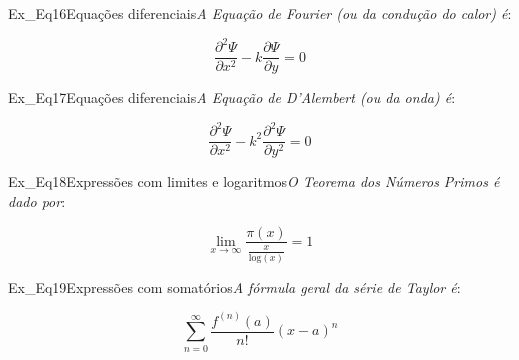 \begin{texercise}{Ex_Eq16}{Equações diferenciais}\textit{A Equação de Fourier (ou da condução do calor) é}:\par\smallskip%
\begin{tcboutputlisting}
    \begin{center}
        \begin{equation*}
            \frac{\partial^{2}\Psi}{\partial x^{2}} -
            k\frac{\partial\Psi}{\partial y} = 0
        \end{equation*}
    \end{center}
\end{tcboutputlisting}
\tcbuselistingtext%
\end{texercise}

\begin{texercise}{Ex_Eq17}{Equações diferenciais}\textit{A Equação de D'Alembert (ou da onda) é}:\par\smallskip%
\begin{tcboutputlisting}
    \begin{center}
        \begin{equation*}
            \frac{\partial^{2}\Psi}{\partial x^{2}} - 
            k^{2}\frac{\partial^{2}\Psi}{\partial y^{2}} = 0
        \end{equation*}
    \end{center}
\end{tcboutputlisting}
\tcbuselistingtext%
\end{texercise}

\begin{texercise}{Ex_Eq18}{Expressões com limites e logaritmos}\textit{O Teorema dos Números Primos é dado por}:\par\smallskip%
\begin{tcboutputlisting}
    \begin{center}
        \begin{equation*}
            \lim_{x \to \infty} 
            \frac{\pi(x)}{\frac{x}{\text{log}(x)}} = 1
        \end{equation*}
    \end{center}
\end{tcboutputlisting}
\tcbuselistingtext%
\end{texercise}

\begin{texercise}{Ex_Eq19}{Expressões com somatórios}\textit{A fórmula geral da série de Taylor é}:\par\smallskip%
\begin{tcboutputlisting}
    \begin{center}
        \begin{equation*}
            \sum_{n=0}^{\infty} \frac{f^{(n)}(a)}{n!}(x-a)^n
        \end{equation*}
    \end{center}
\end{tcboutputlisting}
\tcbuselistingtext%
\end{texercise}

